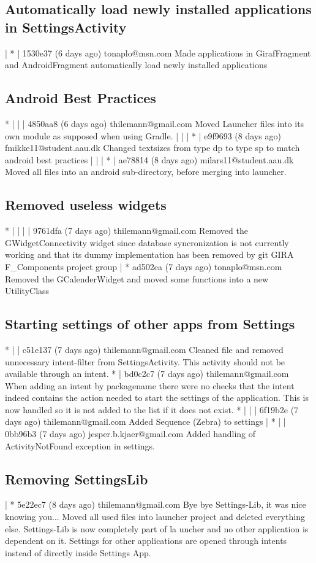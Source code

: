 \subsection{Automatically load newly installed applications in SettingsActivity}
| * | 1530e37 (6 days ago) tonaplo@msn.com Made applications in GirafFragment and AndroidFragment automatically load newly installed applications

\subsection{Android Best Practices}
* | | | 4850aa8 (6 days ago) thilemann@gmail.com Moved Launcher files into its own module as supposed when using Gradle.
| | | * | e9f9693 (8 days ago) fmikke11@student.aau.dk Changed textsizes from type dp to type sp to match android best practices
| | | * | ae78814 (8 days ago) milars11@student.aau.dk Moved all files into an android sub-directory, before merging into launcher.

\subsection{Removed useless widgets}
* | | | | 9761dfa (7 days ago) thilemann@gmail.com Removed the GWidgetConnectivity widget since database syncronization is not currently working and that its dummy implementation has been removed by git GIRA
F_Components project group
| * ad502ea (7 days ago) tonaplo@msn.com Removed the GCalenderWidget and moved some functions into a new UtilityClass

\subsection{Starting settings of other apps from Settings}
* | | c51e137 (7 days ago) thilemann@gmail.com Cleaned file and removed unnecessary intent-filter from SettingsActivity. This activity should not be available through an intent.
* | bd0c2c7 (7 days ago) thilemann@gmail.com When adding an intent by packagename there were no checks that the intent indeed contains the action needed to start the settings of the application. This is now
handled so it is not added to the list if it does not exist.
* | | | 6f19b2e (7 days ago) thilemann@gmail.com Added Sequence (Zebra) to settings
| * | | 0bb96b3 (7 days ago) jesper.b.kjaer@gmail.com Added handling of ActivityNotFound exception in settings.

\subsection{Removing SettingsLib}
| * 5e22ec7 (8 days ago) thilemann@gmail.com Bye bye Settings-Lib, it was nice knowing you... Moved all used files into launcher project and deleted everything else. Settings-Lib is now completely part of la
uncher and no other application is dependent on it. Settings for other applications are opened through intents instead of directly inside Settings App.

